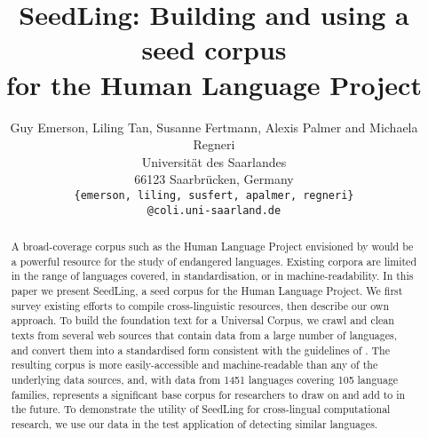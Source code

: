 \documentclass[11pt]{article}
\title{SeedLing: Building and using a seed corpus \\ for the Human Language Project}
\author{Guy Emerson, Liling Tan, Susanne Fertmann, Alexis Palmer and Michaela Regneri \\
Universität des Saarlandes \\
66123 Saarbrücken, Germany \\
{\tt \{emerson, liling, susfert, apalmer, regneri\}} \\
{\tt @coli.uni-saarland.de} \\
}
\date{}
\newcommand{\bluenote}[1]{\textcolor{blue}{[#1]}}
\begin{document}
\maketitle
\begin{abstract}
  A broad-coverage corpus such as the Human Language Project
  envisioned by  would be a powerful
  resource for the study of endangered languages.
  Existing corpora are limited in the range of languages covered, in
  standardisation, or in machine-readability. In this paper we present
  SeedLing, a seed corpus for the Human Language Project. We first
  survey existing efforts to compile cross-linguistic resources, then
  describe our own approach. To build the foundation text for a
  Universal Corpus, we crawl and clean texts from several web sources
  that contain data from a large number of languages, and convert them
  into a standardised form consistent with the guidelines of
  . The resulting corpus is more
  easily-accessible and machine-readable than any of the underlying
  data sources, and, with data from 1451 languages covering 105
  language families, represents a significant base corpus for
  researchers to draw on and add to in the future. To demonstrate the
  utility of SeedLing for cross-lingual computational research, we use our
  data in the test application of detecting similar languages.
\end{abstract}










\end{document}
